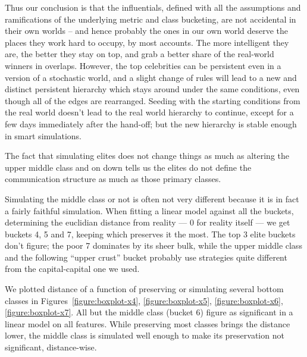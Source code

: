 \documentclass[10pt,oneside]{memoir}
\begin{document}
\begin{Spacing}{2}
Thus our conclusion is that the influentials, defined with all the assumptions and ramifications of the underlying metric and class bucketing, are not accidental in their own worlds -- and hence probably the ones in our own world deserve the places they work hard to occupy, by most accounts.  The more intelligent they are, the better they stay on top, and grab a better share of the real-world winners in overlaps.  However, the top celebrities can be persistent even in a version of a stochastic world, and a slight change of rules will lead to a new and distinct persistent hierarchy which stays around under the same conditions, even though all of the edges are rearranged.  Seeding with the starting conditions from the real world doesn't lead to the real world hierarchy to continue, except for a few days immediately after the hand-off; but the new hierarchy is stable enough in smart simulations.


The fact that simulating elites does not change things as much as altering the upper middle class and on down tells us the elites do not define the communication structure as much as those primary classes.


Simulating the middle class or not is often not very different because it is in fact a fairly faithful simulation.  When fitting a linear model against all the buckets, determining the euclidian distance from reality --- 0 for reality itself --- we get buckets 4, 5 and 7, keeping which preserves it the most.  The top 3 elite buckets don't figure; the poor 7 dominates by its sheer bulk, while the upper middle class and the following ``upper crust'' bucket probably use strategies quite different from the capital-capital one we used.


We plotted distance of a function of preserving or simulating several bottom classes in Figures~\ref{figure:boxplot-x4}, \ref{figure:boxplot-x5}, \ref{figure:boxplot-x6}, \ref{figure:boxplot-x7}.  All but the middle class (bucket 6) figure as significant in a linear model on all features.  While preserving most classes brings the distance lower, the middle class is simulated well enough to make its preservation not significant, distance-wise.




\end{Spacing}
\end{document}
